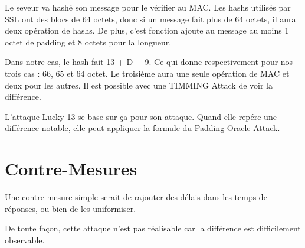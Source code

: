 Le seveur va hashé son message pour le vérifier au MAC. Les hashs utilisés par SSL
ont des blocs de 64 octets, donc si un message fait plus de 64 octets, il aura deux
opération de hashs. De plus, c'est fonction ajoute au message au moins 1 octet de 
padding et 8 octets pour la longueur.

Dans notre cas, le hash fait 13 + D + 9. Ce qui donne respectivement pour nos trois cas :
66, 65 et 64 octet. Le troisième aura une seule opération de MAC et deux pour les autres.
Il est possible avec une TIMMING Attack de voir la différence. 

L'attaque Lucky 13 se base sur ça pour son attaque. Quand elle repére une différence
notable, elle peut appliquer la formule du Padding Oracle Attack.

\section{Contre-Mesures}
\label{sec:cmL13}

Une contre-mesure simple serait de rajouter des délais dans les temps de réponses,
ou bien de les uniformiser.

De toute façon, cette attaque n'est pas réalisable car la différence est difficilement observable. 
